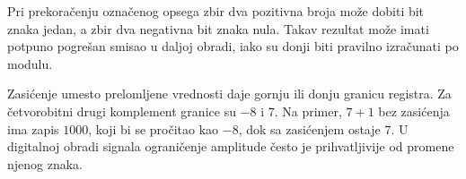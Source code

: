 Pri prekoračenju označenog opsega zbir dva pozitivna broja može dobiti bit znaka jedan, a zbir dva negativna bit znaka nula. Takav rezultat može imati potpuno pogrešan smisao u daljoj obradi, iako su donji biti pravilno izračunati po modulu.

Zasićenje umesto prelomljene vrednosti daje gornju ili donju granicu registra. Za četvorobitni drugi komplement granice su $-8$ i $7$. Na primer, $7+1$ bez zasićenja ima zapis $1000$, koji bi se pročitao kao $-8$, dok sa zasićenjem ostaje $7$. U digitalnoj obradi signala ograničenje amplitude često je prihvatljivije od promene njenog znaka.
